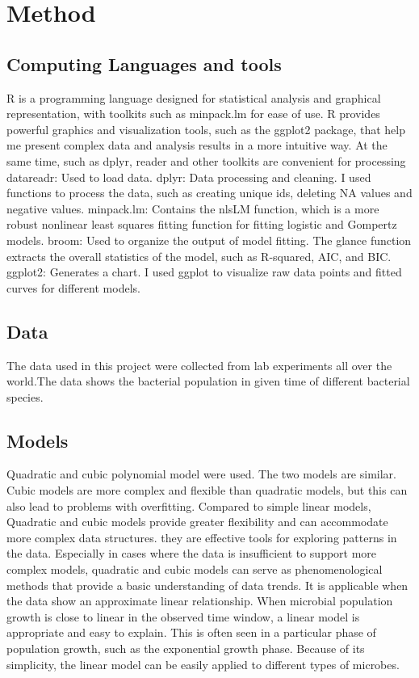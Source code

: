 \documentclass{article}
\begin{document}
\section{Method}
\subsection{Computing Languages and tools}
R is a programming language designed for statistical analysis and graphical representation, with toolkits such as minpack.lm for ease of use.
R provides powerful graphics and visualization tools, such as the ggplot2 package, that help me present complex data and analysis results in a more intuitive way. 
At the same time, such as dplyr, reader and other toolkits are convenient for processing datareadr: Used to load data. 
dplyr: Data processing and cleaning. I used functions to process the data, such as creating unique ids, deleting NA values and negative values.
minpack.lm: Contains the nlsLM function, which is a more robust nonlinear least squares fitting function for fitting logistic and Gompertz models.
broom: Used to organize the output of model fitting. The glance function extracts the overall statistics of the model, such as R-squared, AIC, and BIC.
ggplot2: Generates a chart. I used ggplot to visualize raw data points and fitted curves for different models.

\subsection{Data}
The data used in this project were collected from lab experiments all over the world.The data shows the bacterial population in given time of different bacterial species.

\subsection{Models}

Quadratic and cubic polynomial model were used. The two models are similar. Cubic models are more complex and flexible than quadratic models, but this can also lead to problems with overfitting. Compared to simple linear models, Quadratic and cubic models provide greater flexibility and can accommodate more complex data structures\cite{penny2011}. 
they are effective tools for exploring patterns in the data. Especially in cases where the data is insufficient to support more complex models, quadratic and cubic models can serve as phenomenological methods that provide a basic understanding of data trends. It is applicable when the data show an approximate linear relationship\cite{penny2011}. When microbial population growth is close to linear in the observed time window, a linear model is appropriate and easy to explain. This is often seen in a particular phase of population growth, such as the exponential growth phase. Because of its simplicity, the linear model can be easily applied to different types of microbes.
\end{document}
